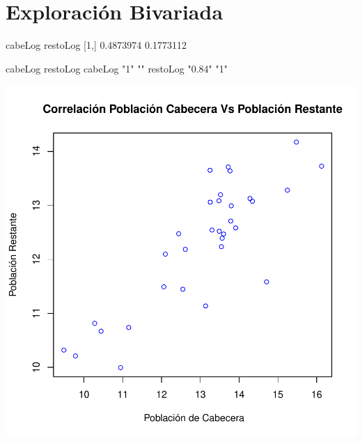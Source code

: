 \section{Exploración Bivariada}\label{bivariada}


\begin{Schunk}
\begin{Soutput}
       cabeLog  restoLog
[1,] 0.4873974 0.1773112
\end{Soutput}
\begin{Soutput}
         cabeLog restoLog
cabeLog  "1"     ""      
restoLog "0.84"  "1"     
\end{Soutput}
\end{Schunk}
\includegraphics{bivariada-correl}

\endinput
